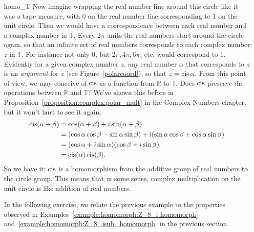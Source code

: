 \begin{example}{homo_T}
\noindent
Now imagine wrapping the real number line around this circle like it was a tape measure, with $0$ on the real number line corresponding to $1$ on the unit circle.  Then we would have a correspondence between each real number and a complex number in ${ \mathbb T}$. Every $2\pi$ units the real numbers start around the circle again, so that an infinite set of real numbers corresponds to each complex number $z$ in ${ \mathbb T}$.  For instance not only 0, but $2\pi, 4\pi, 6\pi$, etc. would correspond to $1$.  
Evidently for a given complex number $z$, any real number $\alpha$ that corresponds to $z$ is an \emph{argument} for $z$ (see Figure~\ref{polarcoord}), so that $z = \operatorname{cis} \alpha$.
From this point of view, we may conceive of $\operatorname{cis}$ as  a function from ${ \mathbb R}$ to  ${ \mathbb T}$.   Does $\operatorname{cis}$ preserve the operations between ${ \mathbb R}$ and ${ \mathbb T}$? We've shown this before in Proposition~\ref{proposition:complex:polar_mult} in the Complex Numbers chapter, but it won't hurt to see it again:
\begin{align*}
\operatorname{cis}( \alpha + \beta )
& =
\cos( \alpha + \beta ) + i \sin( \alpha + \beta ) \\
& =
(\cos \alpha \cos \beta - \sin \alpha \sin \beta)  + i( \sin \alpha 
\cos \beta + \cos \alpha \sin \beta ) \\
& =
(\cos \alpha + i \sin \alpha )(\cos \beta + i \sin \beta
) \\
& = \operatorname{cis}( \alpha ) \operatorname{cis}( \beta ).
\end{align*}
So we have it; $\operatorname{cis}$ is a homomorphism from the additive group of real numbers to the circle group.
This means that in some sense, complex multiplication on the unit circle is like addition of real numbers.
\end{example}


In the following exercise, we relate the previous example to the properties observed in  Examples~\ref{example:homomorph:Z_8_i homomorph} and~\ref{example:homomorph:Z_8_isub_homomorph} in the previous section.

